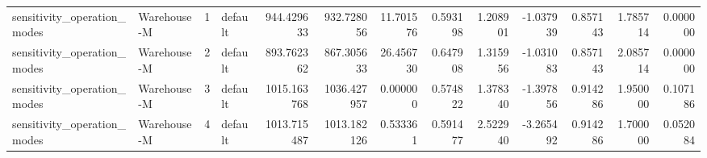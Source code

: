 \begin{tabular}{llrlrrrrrrrrr}
sensitivity\_operation\_modes & Warehouse-M & 1 & default & 944.429633 & 932.728056 & 11.701576 & 0.593198 & 1.208901 & -1.037939 & 0.857143 & 1.785714 & 0.000000 \\
sensitivity\_operation\_modes & Warehouse-M & 2 & default & 893.762362 & 867.305633 & 26.456730 & 0.647908 & 1.315956 & -1.031083 & 0.857143 & 2.085714 & 0.000000 \\
sensitivity\_operation\_modes & Warehouse-M & 3 & default & 1015.163768 & 1036.427957 & 0.000000 & 0.574822 & 1.378340 & -1.397856 & 0.914286 & 1.950000 & 0.107186 \\
sensitivity\_operation\_modes & Warehouse-M & 4 & default & 1013.715487 & 1013.182126 & 0.533361 & 0.591477 & 2.522940 & -3.265492 & 0.914286 & 1.700000 & 0.052084 \\
\bottomrule
\end{tabular}
